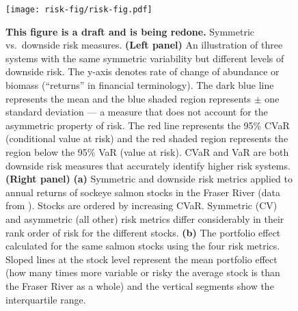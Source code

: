 \begin{figure}[htbp]
\centering
\texttt{[image: risk-fig/risk-fig.pdf]}
\caption{
  \textbf{This figure is a draft and is being redone.}
  Symmetric vs.\ downside risk measures. \textbf{(Left panel)} An illustration
  of three systems with the same symmetric variability but different levels of
  downside risk. The y-axis denotes rate of change of abundance or biomass
  (``returns'' in financial terminology). The dark blue line represents the
  mean and the blue shaded region represents $\pm$ one standard deviation --- a
  measure that does not account for the asymmetric property of risk. The red
  line represents the 95\% CVaR (conditional value at risk) and the red shaded
  region represents the region below the 95\% VaR (value at risk). CVaR and VaR
  are both downside risk measures that accurately identify higher risk systems.
  \textbf{(Right panel)} \textbf{(a)} Symmetric and downside risk metrics
  applied to annual returns of sockeye salmon stocks in the Fraser River (data
  from \citeauthor{dorner2008} \citeyear{dorner2008}). Stocks are ordered by
  increasing CVaR. Symmetric (CV) and asymmetric (all other) risk metrics
  differ considerably in their rank order of risk for the different stocks.
  \textbf{(b)} The portfolio effect calculated for the same salmon stocks using
  the four risk metrics. Sloped lines at the stock level represent the mean
  portfolio effect (how many times more variable or risky the average stock is
  than the Fraser River as a whole) and the vertical segments show the
  interquartile range.} \label{fig:risk}
\end{figure}
